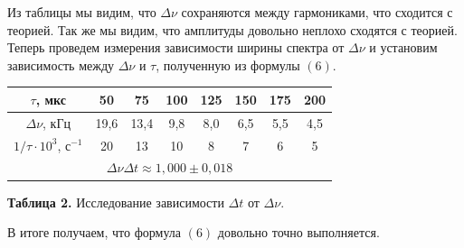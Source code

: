 \documentclass[a4paper, 12pt]{article}%
\begin{document}
Из таблицы мы видим, что $\Delta \nu$ сохраняются между гармониками, что сходится с теорией. Так же мы видим, что амплитуды довольно неплохо сходятся с теорией.
Теперь проведем измерения зависимости ширины спектра от $\Delta \nu$ и установим зависимость между $\Delta \nu$ и $\tau$, полученную из формулы $(6)$.
\begin{center}
\begin{tabular}{|c|c|c|c|c|c|c|c|}
\hline
$\tau$, мкс & 50 & 75 & 100 & 125 & 150 & 175 & 200 \\ \hline
$\Delta \nu$, кГц & 19,6 & 13,4 & 9,8 & 8,0 & 6,5 & 5,5 & 4,5 \\ \hline
$1/\tau \cdot 10^3$, с$^{-1}$ & 20 & 13 & 10 & 8 & 7 & 6 & 5 \\ \hline
\multicolumn{8}{|c|}{$\Delta \nu \Delta t \approx 1,000 \pm 0,018$} \\ \hline
\end{tabular}

\textbf{Таблица 2.} Исследование зависимости $\Delta t$ от $\Delta \nu$.
\end{center}
В итоге получаем, что формула $(6)$ довольно точно выполняется.
\newpage
\end{document}
